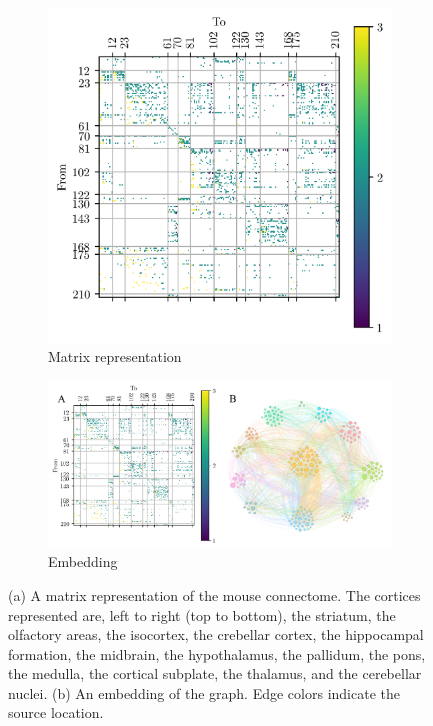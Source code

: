 \begin{figure}[ht]
  \centering
  \begin{subfigure}{0.45\textwidth}
    \centering
    \includegraphics[width=\textwidth]{figure/n}
    \caption{Matrix representation}
    \label{fig:mouse_matrix}
  \end{subfigure} %
  \begin{subfigure}{0.45\textwidth}
    \centering
    \includegraphics[width=\textwidth]{figure/network}
    \caption{Embedding}
    \label{fig:mouse_embedding}
  \end{subfigure}
  \caption[Mouse connectome]{(a) A matrix representation of the mouse connectome.
    The cortices represented are, left to right (top to bottom),
    the striatum,
    the olfactory areas,
    the isocortex,
    the crebellar cortex,
    the hippocampal formation,
    the midbrain,
    the hypothalamus,
    the pallidum,
    the pons,
    the medulla,
    the cortical subplate,
    the thalamus,
    and the cerebellar nuclei.
    (b) An embedding of the graph.
    Edge colors indicate the source location.
  }
  \label{fig:mouse_connectome}
\end{figure}

